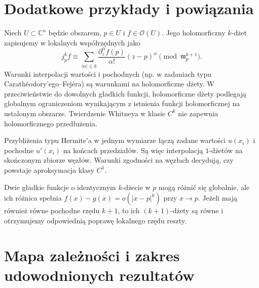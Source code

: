 \section{Dodatkowe przykłady i powiązania}
\begin{przyklad}
Niech $U\subset\mathbb C^n$ będzie obszarem,
$p\in U$ i $f\in\mathcal O(U)$. Jego holomorficzny
$k$-dżet zapisujemy w lokalnych współrzędnych jako
\[
 j_p^kf\equiv\sum_{|\alpha|\le k}
 \frac{\partial_z^\alpha f(p)}{\alpha!}(z-p)^\alpha
 \pmod{\mathfrak m_p^{k+1}}.
\]
Warunki interpolacji wartości i pochodnych
(np. w zadaniach typu Carathéodory'ego--Fejéra)
są warunkami na holomorficzne dżety.
W przeciwieństwie do dowolnych gładkich funkcji,
holomorficzne dżety podlegają globalnym ograniczeniom
wynikającym z istnienia funkcji holomorficznej na
ustalonym obszarze. Twierdzenie Whitneya w klasie $C^k$
nie zapewnia holomorficznego przedłużenia.
\end{przyklad}

\begin{przyklad}
Przybliżenia typu Hermite'a w jednym wymiarze
łączą zadane wartości $u(x_i)$ i pochodne $u'(x_i)$
na końcach przedziałów. Są więc interpolacją
$1$-dżetów na skończonym zbiorze węzłów.
Warunki zgodności na węzłach decydują,
czy powstaje aproksymacja klasy $C^1$.
\end{przyklad}

\begin{przyklad}
Dwie gładkie funkcje o identycznym $k$-dżecie w $p$
mogą różnić się globalnie, ale ich różnica
spełnia $f(x)-g(x)=o(|x-p|^k)$ przy $x\to p$.
Jeżeli mają również równe pochodne rzędu $k+1$,
to ich $(k+1)$-dżety są równe i otrzymujemy
odpowiednią poprawę lokalnego rzędu reszty.
\end{przyklad}

\section{Mapa zależności i zakres udowodnionych rezultatów}
\begin{center}
\end{center}

